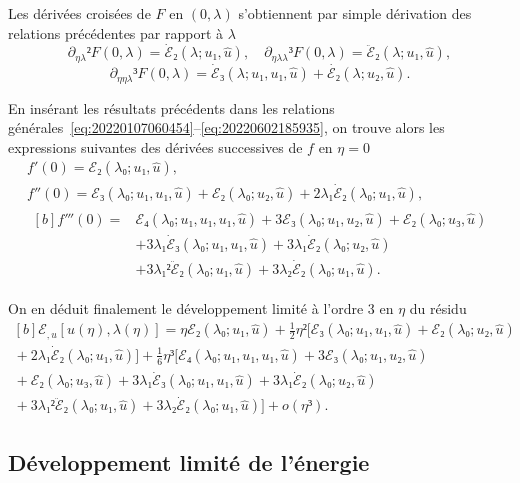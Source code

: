 \documentclass[12pt, final]{scrartcl}
\theoremstyle{definition}
\begin{document}
Les dérivées croisées de \(F\) en \((0, λ)\) s'obtiennent par simple dérivation
des relations précédentes par rapport à \(λ\)
\[∂_{ηλ}² F(0, λ) = \dot{ℰ}₂(λ; u₁, \hat{u}), \quad ∂_{ηλλ}³ F(0, λ) = \ddot{ℰ}₂(λ; u₁, \hat{u}),\]
\[∂_{ηηλ}³ F(0, λ) = \dot{ℰ}₃(λ; u₁, u₁, \hat{u}) + \dot{ℰ₂}(λ; u₂, \hat{u}).\]

En insérant les résultats précédents dans les relations
générales~\eqref{eq:20220107060454}--\eqref{eq:20220602185935}, on trouve alors
les expressions suivantes des dérivées successives de \(f\) en \(η = 0\)
\begin{gather*}
  f'(0) = ℰ₂(λ₀; u₁, \hat{u}),\\
  f''(0) = ℰ₃(λ₀; u₁, u₁, \hat{u}) + ℰ₂(λ₀; u₂, \hat{u}) + 2 λ₁ \dot{ℰ}₂(λ₀; u₁, \hat{u}),\\
  \begin{aligned}[b]
    f'''(0) ={}
    & ℰ₄(λ₀; u₁, u₁, u₁, \hat{u}) + 3ℰ₃(λ₀; u₁, u₂, \hat{u}) + ℰ₂(λ₀ ; u₃, \hat{u})\\
    & + 3λ₁ \dot{ℰ}₃(λ₀; u₁, u₁, \hat{u}) + 3λ₁ \dot{ℰ}₂(λ₀; u₂, \hat{u})\\
    & + 3 λ₁² \ddot{ℰ}₂(λ₀; u₁, \hat{u}) + 3 λ₂ \dot{ℰ}₂(λ₀; u₁, \hat{u}).
  \end{aligned}
\end{gather*}

On en déduit finalement le développement limité à l'ordre 3 en \(η\) du résidu
\begin{equation}
  \label{eq:20220107080901}
  \begin{gathered}[b]
    ℰ_{, u}[u(η), λ(η)] ={} η ℰ₂(λ₀; u₁, \hat{u}) + \tfrac{1}{2} η² \bigl[ℰ₃(λ₀; u₁, u₁, \hat{u})  + ℰ₂(λ₀; u₂, \hat{u})\\
    {} + 2 λ₁ \dot{ℰ}₂(λ₀; u₁, \hat{u})\bigr] + \tfrac{1}{6} η³ \bigl[ ℰ₄(λ₀; u₁, u₁, u₁, \hat{u}) + 3ℰ₃(λ₀; u₁, u₂, \hat{u})\\
    {} + ℰ₂(λ₀; u₃, \hat{u}) + 3λ₁ \dot{ℰ}₃(λ₀; u₁, u₁, \hat{u}) + 3λ₁ \dot{ℰ}₂(λ₀; u₂, \hat{u})\\
    {} + 3 λ₁² \ddot{ℰ}₂(λ₀; u₁, \hat{u}) + 3 λ₂ \dot{ℰ}₂(λ₀ ; u₁, \hat{u}) \bigr] + o(η³).
  \end{gathered}
\end{equation}

\subsection{Développement limité de l'énergie}
\label{sec:20220525053434}
%
\end{document}
